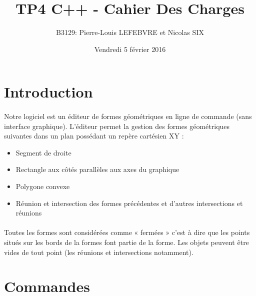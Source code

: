\documentclass[a4paper, 12pts]{article}
\title{TP4 C++ - Cahier Des Charges}
\author{B3129: Pierre-Louis LEFEBVRE et Nicolas SIX}
\date{Vendredi 5 février 2016}
\begin{document}
\begin{titlepage}

\maketitle

\end{titlepage}


\tableofcontents

\pagebreak


\section{Introduction}

\paragraph{}
Notre logiciel est un éditeur de formes géométriques en ligne de commande (sans interface graphique). L'éditeur permet la gestion des formes géométriques suivantes dans un plan possédant un repère cartésien XY :

\begin{itemize}
	\item Segment de droite
	\item Rectangle aux côtés parallèles aux axes du graphique
	\item Polygone convexe
	\item Réunion et intersection des formes précédentes et d'autres intersections et réunions
\end{itemize}

\paragraph{}
Toutes les formes sont considérées comme « fermées » c'est à dire que les points situés sur les bords de la formes font partie de la forme. Les objets peuvent être vides de tout point (les réunions et intersections notamment).

\section{Commandes}
\end{document}
